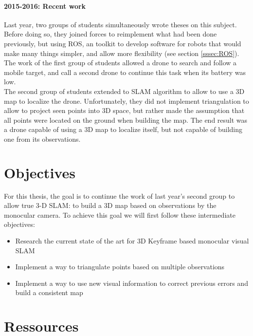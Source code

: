 \paragraph{2015-2016: Recent work}
Last year, two groups of students simultaneously wrote theses on this subject. Before doing so, they joined forces to reimplement what had been done previously, but using ROS, an toolkit to develop software for robots that would make many things simpler, and allow more flexibility (see section \ref{sssec:ROS}).
The work of the first group of students allowed a drone to search and follow a mobile target, and call a second drone to continue this task when its battery was low.\\
The second group of students extended to SLAM algorithm to allow to use a 3D map to localize the drone. Unfortunately, they did not implement triangulation to allow to project seen points into 3D space, but rather made the assumption that all points were located on the ground when building the map. The end result was a drone capable of using a 3D map to localize itself, but not capable of building one from its observations.


\section{Objectives}
For this thesis, the goal is to continue the work of last year's second group to allow true 3-D SLAM: to build a 3D map based on observations by the monocular camera. To achieve this goal we will first follow these intermediate objectives:
\begin{itemize}
\item Research the current state of the art for 3D Keyframe based monocular visual SLAM
\item Implement a way to triangulate points based on multiple observations
\item Implement a way to use new visual information to correct previous errors and build a consistent map
\end{itemize}


\section{Ressources}

